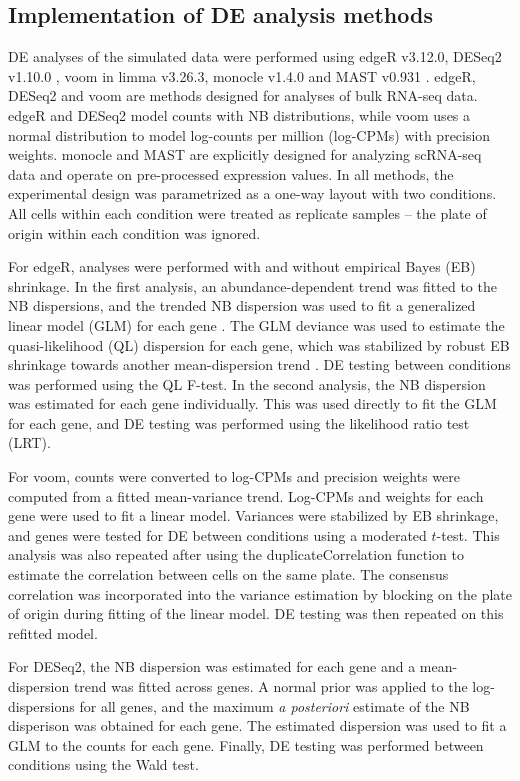\documentclass{article}
\begin{document}
\subsection{Implementation of DE analysis methods}
DE analyses of the simulated data were performed using edgeR v3.12.0, DESeq2 v1.10.0 \cite{love2014moderated}, voom \cite{law2014voom} in limma v3.26.3, 
    monocle v1.4.0 and MAST v0.931 \cite{finak2015mast}.
edgeR, DESeq2 and voom are methods designed for analyses of bulk RNA-seq data.
edgeR and DESeq2 model counts with NB distributions, while voom uses a normal distribution to model log-counts per million (log-CPMs) with precision weights.
monocle and MAST are explicitly designed for analyzing scRNA-seq data and operate on pre-processed expression values.
In all methods, the experimental design was parametrized as a one-way layout with two conditions.
All cells within each condition were treated as replicate samples -- the plate of origin within each condition was ignored.

For edgeR, analyses were performed with and without empirical Bayes (EB) shrinkage.
In the first analysis, an abundance-dependent trend was fitted to the NB dispersions, 
    and the trended NB dispersion was used to fit a generalized linear model (GLM) for each gene \cite{mccarthy2012differential}.
The GLM deviance was used to estimate the quasi-likelihood (QL) dispersion for each gene, 
    which was stabilized by robust EB shrinkage towards another mean-dispersion trend \cite{lund2012detecting}.
DE testing between conditions was performed using the QL F-test.
In the second analysis, the NB dispersion was estimated for each gene individually.
This was used directly to fit the GLM for each gene, and DE testing was performed using the likelihood ratio test (LRT).

For voom, counts were converted to log-CPMs and precision weights were computed from a fitted mean-variance trend.
Log-CPMs and weights for each gene were used to fit a linear model.
Variances were stabilized by EB shrinkage, and genes were tested for DE between conditions using a moderated $t$-test.
This analysis was also repeated after using the duplicateCorrelation function to estimate the correlation between cells on the same plate.
The consensus correlation was incorporated into the variance estimation by blocking on the plate of origin during fitting of the linear model.
DE testing was then repeated on this refitted model.

For DESeq2, the NB dispersion was estimated for each gene and a mean-dispersion trend was fitted across genes.
A normal prior was applied to the log-dispersions for all genes, and the maximum \textit{a posteriori} estimate of the NB disperison was obtained for each gene.
The estimated dispersion was used to fit a GLM to the counts for each gene.
Finally, DE testing was performed between conditions using the Wald test.
\end{document}
